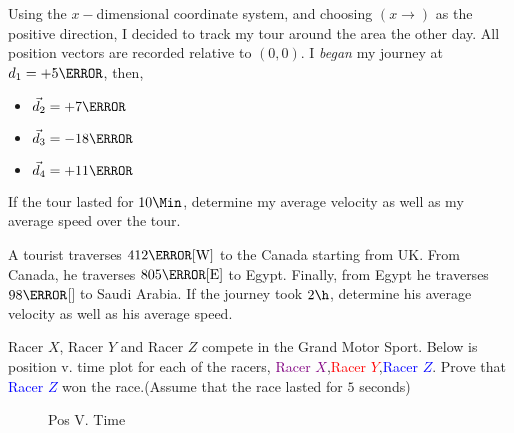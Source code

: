 \documentclass[12pt]{article} %
\newcommand{\tx}[1]{\text{#1}}
\begin{document}
 \begin{qstn}[2]
    Using the $x-$dimensional coordinate system, and choosing $(x \rightarrow )$ as the positive direction, I decided to track my tour around the area the other day. All position vectors are recorded relative to $(0,0)$. I \emph{began} my journey at $d_1 = + 5\m$, then,
    \begin{itemize}
        \item $\vec d_2 = + 7\m$
        \item $\vec d_3 = -18\m$
        \item $\vec d_4 = +11\m$
    \end{itemize}
    If the tour lasted for $10\Min$, determine my average velocity as well as my average speed over the tour.
 \end{qstn}



\begin{qstn}[3]
    A tourist traverses $412\km[\tx{W}]$ to the Canada starting from UK. From Canada, he traverses $805\km[\tx{E}]$ to Egypt. Finally, from Egypt he traverses $98\km$[\tx{E}] to Saudi Arabia. If the journey took $2 \h$, determine his average velocity as well as his average speed. 
\end{qstn}


\begin{qstn}[4]
    Racer $X$, Racer $Y$ and Racer $Z$ compete in the Grand Motor Sport. Below is position v. time plot for each of the racers, \textcolor{purple}{Racer $X$},\textcolor{red}{Racer $Y$},\textcolor{blue}{Racer $Z$}. Prove that \textcolor{blue}{Racer $Z$} won the race.(Assume that the race lasted for $5$ seconds)
    \begin{figure}[h]
        \centering
        \caption{Pos V. Time}
        \label{fig:my-awesome-graph}
    \end{figure}



\end{qstn}
\end{document}
